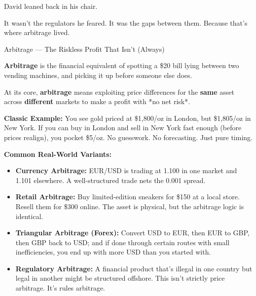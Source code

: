 \medskip

David leaned back in his chair.

It wasn’t the regulators he feared.
It was the gaps between them.
Because that’s where arbitrage lived.

\medskip

\begin{TechnicalSidebar}{Arbitrage --- The Riskless Profit That Isn’t (Always)}

    \textbf{Arbitrage} is the financial equivalent of spotting a \$20 bill lying between two 
    vending machines, and picking it up before someone else does.

\medskip
    
    At its core, \textbf{arbitrage} means exploiting price differences for the \textbf{same} 
    asset across \textbf{different} markets to make a profit with *no net risk*.

\medskip
    
    \textbf{Classic Example:}  
    You see gold priced at \$1,800/oz in London, but \$1,805/oz in New York.  
    If you can buy in London and sell in New York fast enough (before prices realign), you pocket \$5/oz.  
    No guesswork. No forecasting. Just pure timing.

\medskip
    
    \textbf{Common Real-World Variants:}

\medskip

    \begin{itemize}
      \item \textbf{Currency Arbitrage:}  
      EUR/USD is trading at 1.100 in one market and 1.101 elsewhere. A well-structured trade nets 
      the 0.001 spread.
    
      \item \textbf{Retail Arbitrage:}  
      Buy limited-edition sneakers for \$150 at a local store. Resell them for \$300 online. The asset 
      is physical, but the arbitrage logic is identical.
    
      \item \textbf{Triangular Arbitrage (Forex):}  
      Convert USD to EUR, then EUR to GBP, then GBP back to USD; and if done through certain routes 
      with small inefficiencies, you end up with more USD than you started with. 
    
      \item \textbf{Regulatory Arbitrage:}  
      A financial product that's illegal in one country but legal in another might be structured offshore. 
      This isn't strictly price arbitrage. It's rules arbitrage.
    \end{itemize}
    

\end{TechnicalSidebar}
